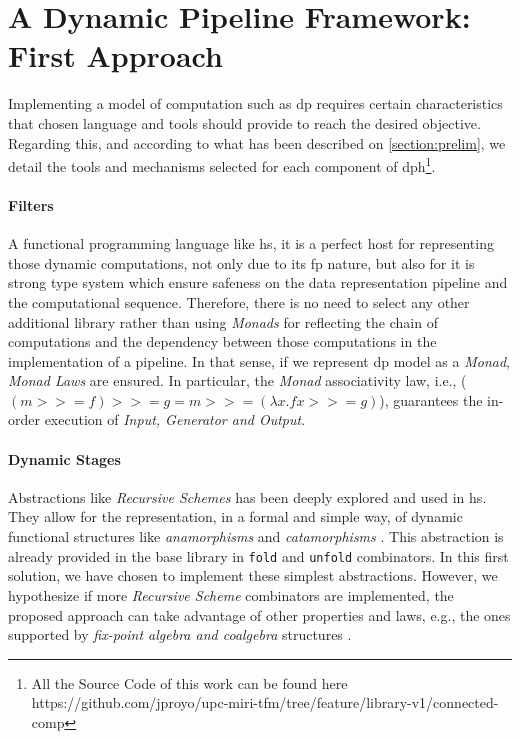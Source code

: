 \documentclass[preprint]{elsarticle}
\begin{document}
\section{A Dynamic Pipeline Framework: First Approach}\label{section:prob:dp:haskell}
Implementing a model of computation such as \acrshort{dp} requires certain characteristics that chosen language and tools should provide to reach the desired objective. Regarding this, and according to what has been described on \autoref{section:prelim}, we detail the tools and mechanisms selected for each component of \acrshort{dph}\footnote{All the Source Code of this work can be found here https://github.com/jproyo/upc-miri-tfm/tree/feature/library-v1/connected-comp}.

\paragraph{Filters \label{sub:sec:filter}} A functional programming language like \acrshort{hs}, it is a perfect host for representing those dynamic computations, not only due to its \acrshort{fp} nature, but also for it is strong type system which ensure safeness on the data representation pipeline and the computational sequence. Therefore, there is no need to select any other additional library rather than using \emph{Monads} \cite{monads} for reflecting the chain of computations and the dependency between those computations in the implementation of a pipeline. In that sense, if we represent \acrshort{dp} model as a \emph{Monad}, \emph{Monad Laws} \cite{monadlaws} are ensured. In particular, the \emph{Monad} associativity law, i.e.,  ($(m >>= f ) >>= g = m >>= (\lambda x.f x >>= g)$), guarantees the in-order execution of \emph{Input, Generator and Output}.

\paragraph{Dynamic Stages}  Abstractions like \textit{Recursive Schemes} \cite{lenses} has been deeply explored and used in \acrshort{hs}. They allow for the representation, in a formal and simple way, of dynamic functional structures like \textit{anamorphisms} and \textit{catamorphisms} \cite{lenses}. This abstraction is already provided in the base library in \texttt{fold} and \texttt{unfold} combinators. In this first solution, we have chosen to implement these simplest abstractions. However, we hypothesize if more \textit{Recursive Scheme} combinators are implemented, the proposed approach can take advantage of other properties and laws, e.g., the ones supported by \emph{fix-point algebra and coalgebra} structures \cite{lenses}. 
\end{document}
